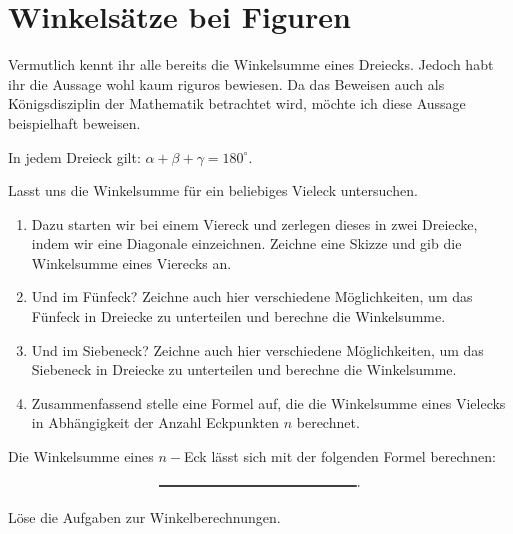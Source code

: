 \documentclass[11pt,oneside]{article}
\begin{document}
\section{Winkelsätze bei Figuren}
	Vermutlich kennt ihr alle bereits die Winkelsumme eines Dreiecks. Jedoch habt ihr die Aussage wohl kaum riguros bewiesen. Da das Beweisen auch als Königsdisziplin der Mathematik betrachtet wird, möchte ich diese Aussage beispielhaft beweisen.
	\begin{satz}
		In jedem Dreieck gilt: $\alpha+\beta+\gamma=180^\circ$.
	\end{satz}
	\begin{beweis}
	\end{beweis}
	Lasst uns die Winkelsumme für ein beliebiges Vieleck untersuchen.
	\begin{aufgabe}
		\begin{enumerate}[label=\alph*)]
			\item Dazu starten wir bei einem Viereck und zerlegen dieses in zwei Dreiecke, indem wir eine Diagonale einzeichnen. Zeichne eine Skizze und gib die Winkelsumme eines Vierecks an.
		\end{enumerate}
		\begin{enumerate}[label=\alph*)]\setcounter{enumi}{1}
			\item Und im Fünfeck? Zeichne auch hier verschiedene Möglichkeiten, um das Fünfeck in Dreiecke zu unterteilen und berechne die Winkelsumme.
		\end{enumerate}
		\begin{enumerate}[label=\alph*)]\setcounter{enumi}{2}
			\item Und im Siebeneck? Zeichne auch hier verschiedene Möglichkeiten, um das Siebeneck in Dreiecke zu unterteilen und berechne die Winkelsumme.
		\end{enumerate}
		\begin{enumerate}[label=\alph*)]\setcounter{enumi}{3}
			\item Zusammenfassend stelle eine Formel auf, die die Winkelsumme eines Vielecks in Abhängigkeit der Anzahl Eckpunkten $n$ berechnet.
		\end{enumerate}
	\end{aufgabe}
	\begin{satz}
		Die Winkelsumme eines $n-$Eck lässt sich mit der folgenden Formel berechnen:\[\gap{5}.\]
	\end{satz}
	\begin{aufgabe}
		Löse die Aufgaben zur Winkelberechnungen.
	\end{aufgabe}\newpage
\end{document}

